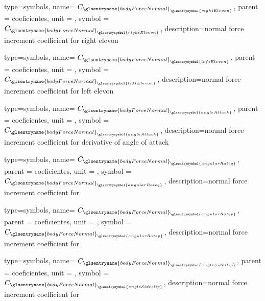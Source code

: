 {type=symbols,
    name= \ensuremath{C_{{\glsentryname{bodyForceNormal}}_{\glsentrysymbol{rightElevon}}}},
    parent = {coeficientes},
    unit = \unexpanded{},
    symbol = \ensuremath{C_{{\glsentryname{bodyForceNormal}}_{\glsentrysymbol{rightElevon}}}},
    description={normal force increment coefficient for right elevon}
}

{type=symbols,
    name= \ensuremath{C_{{\glsentryname{bodyForceNormal}}_{\glsentrysymbol{leftElevon}}}},
    parent = {coeficientes},
    unit = \unexpanded{},
    symbol = \ensuremath{C_{{\glsentryname{bodyForceNormal}}_{\glsentrysymbol{leftElevon}}}},
    description={normal force increment coefficient for left elevon}
}

{type=symbols,
    name= \ensuremath{C_{{\glsentryname{bodyForceNormal}}_{\dot{\glsentrysymbol{angleAttack}}}}},
    parent = {coeficientes},
    unit = \unexpanded{},
    symbol = \ensuremath{C_{{\glsentryname{bodyForceNormal}}_{\dot{\glsentrysymbol{angleAttack}}}}},
    description={normal force increment coefficient for derivative of angle of attack}
}

{type=symbols,
    name= \ensuremath{C_{{\glsentryname{bodyForceNormal}}_{\glsentrysymbol{angularRateq}}}},
    parent = {coeficientes},
    unit = \unexpanded{},
    symbol = \ensuremath{C_{{\glsentryname{bodyForceNormal}}_{\glsentrysymbol{angularRateq}}}},
    description={normal force increment coefficient for }
}

{type=symbols,
    name= \ensuremath{C_{{\glsentryname{bodyForceNormal}}_{\glsentrysymbol{angularRatep}}}},
    parent = {coeficientes},
    unit = \unexpanded{},
    symbol = \ensuremath{C_{{\glsentryname{bodyForceNormal}}_{\glsentrysymbol{angularRatep}}}},
    description={normal force increment coefficient for }
}

{type=symbols,
    name= \ensuremath{C_{{\glsentryname{bodyForceNormal}}_{\glsentrysymbol{angleSideslip}}}},
    parent = {coeficientes},
    unit = \unexpanded{},
    symbol = \ensuremath{C_{{\glsentryname{bodyForceNormal}}_{\glsentrysymbol{angleSideslip}}}},
    description={normal force increment coefficient for }
}

